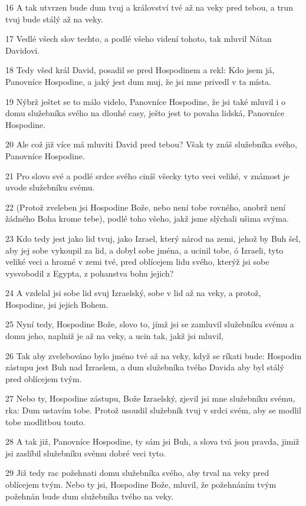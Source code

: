 \par 16 A tak utvrzen bude dum tvuj a království tvé až na veky pred tebou, a trun tvuj bude stálý až na veky.
\par 17 Vedlé všech slov techto, a podlé všeho videní tohoto, tak mluvil Nátan Davidovi.
\par 18 Tedy všed král David, posadil se pred Hospodinem a rekl: Kdo jsem já, Panovníce Hospodine, a jaký jest dum muj, že jsi mne privedl v ta místa.
\par 19 Nýbrž ještet se to málo videlo, Panovníce Hospodine, že jsi také mluvil i o domu služebníka svého na dlouhé casy, ješto jest to povaha lidská, Panovníce Hospodine.
\par 20 Ale což již více má mluviti David pred tebou? Však ty znáš služebníka svého, Panovníce Hospodine.
\par 21 Pro slovo své a podlé srdce svého ciníš všecky tyto veci veliké, v známost je uvode služebníku svému.
\par 22 (Protož zveleben jsi Hospodine Bože, nebo není tobe rovného, anobrž není žádného Boha krome tebe), podlé toho všeho, jakž jsme slýchali ušima svýma.
\par 23 Kdo tedy jest jako lid tvuj, jako Izrael, který národ na zemi, jehož by Buh šel, aby jej sobe vykoupil za lid, a dobyl sobe jména, a ucinil tobe, ó Izraeli, tyto veliké veci a hrozné v zemi tvé, pred oblícejem lidu svého, kterýž jsi sobe vysvobodil z Egypta, z pohanstva bohu jejich?
\par 24 A vzdelal jsi sobe lid svuj Izraelský, sobe v lid až na veky, a protož, Hospodine, jsi jejich Bohem.
\par 25 Nyní tedy, Hospodine Bože, slovo to, jímž jsi se zamluvil služebníku svému a domu jeho, naplniž je až na veky, a ucin tak, jakž jsi mluvil,
\par 26 Tak aby zvelebováno bylo jméno tvé až na veky, když se ríkati bude: Hospodin zástupu jest Buh nad Izraelem, a dum služebníka tvého Davida aby byl stálý pred oblícejem tvým.
\par 27 Nebo ty, Hospodine zástupu, Bože Izraelský, zjevil jsi mne služebníku svému, rka: Dum ustavím tobe. Protož usoudil služebník tvuj v srdci svém, aby se modlil tobe modlitbou touto.
\par 28 A tak již, Panovníce Hospodine, ty sám jsi Buh, a slova tvá jsou pravda, jimiž jsi zaslíbil služebníku svému dobré veci tyto.
\par 29 Již tedy rac požehnati domu služebníka svého, aby trval na veky pred oblícejem tvým. Nebo ty jsi, Hospodine Bože, mluvil, že požehnáním tvým požehnán bude dum služebníka tvého na veky.

